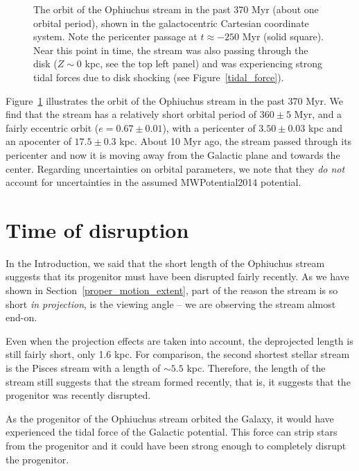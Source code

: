 \documentclass[iop]{emulateapj}
\begin{document}
\begin{figure}
\caption{
The orbit of the Ophiuchus stream in the past 370 Myr (about one orbital
period), shown in the galactocentric Cartesian coordinate system. Note the
pericenter passage at $t\approx-250$ Myr (solid square). Near this point in
time, the stream was also passing through the disk ($Z\sim0$ kpc, see the top
left panel) and was experiencing strong tidal forces due to disk shocking
(see Figure~\ref{tidal_force}).
\label{orbit_XYZ}}
\end{figure}

Figure~\ref{orbit_XYZ} illustrates the orbit of the Ophiuchus stream in the past
370 Myr. We find that the stream has a relatively short orbital period of
$360\pm5$ Myr, and a fairly eccentric orbit ($e=0.67\pm0.01$), with a
pericenter of $3.50\pm0.03$ kpc and an apocenter of $17.5\pm0.3$ kpc. About 10
Myr ago, the stream passed through its pericenter and now it is moving away from
the Galactic plane and towards the center. Regarding uncertainties on orbital
parameters, we note that they {\em do not} account for uncertainties in the
assumed MWPotential2014 potential.

\section{Time of disruption}

In the Introduction, we said that the short length of the Ophiuchus stream
suggests that its progenitor must have been disrupted fairly recently. As we
have shown in Section~\ref{proper_motion_extent}, part of the reason the stream
is so short {\em in projection}, is the viewing angle -- we are observing the
stream almost end-on.

Even when the projection effects are taken into account, the deprojected length
is still fairly short, only 1.6 kpc. For comparison, the second shortest stellar
stream is the Pisces stream \citep[also known as the Triangulum stream,
\citealt{bon12}]{pisces} with a length of $\sim5.5$ kpc. Therefore, the length
of the stream still suggests that the stream formed recently, that is, it
suggests that the progenitor was recently disrupted.

As the progenitor of the Ophiuchus stream orbited the Galaxy, it would have
experienced the tidal force of the Galactic potential. This force can strip
stars from the progenitor and it could have been strong enough to completely
disrupt the progenitor. 
\end{document}
